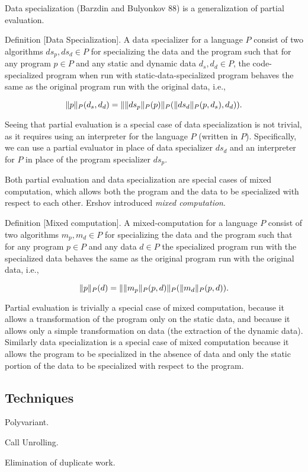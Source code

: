 Data specialization (Barzdin and Bulyonkov 88) is a generalization of
partial evaluation.

Definition [Data Specialization].  A data specializer for a language
$P$ consist of two algorithms $ds_p, ds_d \in P$ for specializing the
data and the program such that for any program $p \in P$ and any
static and dynamic data $d_s, d_d \in P$, the code-specialized program
when run with static-data-specialized program behaves the same as the
original program run with the original data, i.e.,

\[
\drun{P}{p} (d_s, d_d) = \drun{P}{\drun{P}{ds_p} (p)} (\drun{P}{ds_d}
(p,d_s), d_d)).
\]

Seeing that partial evaluation is a special case of data
specialization is not trivial, as it requires using an interpreter for
the language $P$ (written in $P$).  Specifically, we can use a partial
evaluator in place of data specializer $ds_d$ and an  interpreter for $P$ in
place of the program specializer $ds_p$. 


Both partial evaluation and data specialization are special cases of
mixed computation, which allows both the program and the data to be
specialized with respect to each other.  Ershov introduced {\em mixed
  computation}. 


Definition [Mixed computation]. A mixed-computation for a language $P$
consist of two algorithms $m_p, m_d \in P$ for specializing the data
and the program such that for any program $p \in P$ and any data $d
\in P$ the specialized program run with the specialized data behaves
the same as the original program run with the original data, i.e.,

\[
\drun{P}{p} (d) = \drun{P}{\drun{P}{m_p} (p,d)} (\drun{P}{m_d} (p,d)).
\]


Partial evaluation is trivially a special case of mixed computation,
because it allows a transformation of the program only on the static
data, and because it allows only a simple transformation on data (the
extraction of the dynamic data).  Similarly data specialization is a
special case of mixed computation because it allows the program to be
specialized in the absence of data and only the static portion of the
data to be specialized with respect to the program.


\subsection{Techniques}

Polyvariant.

Call Unrolling.

Elimination of duplicate work.
